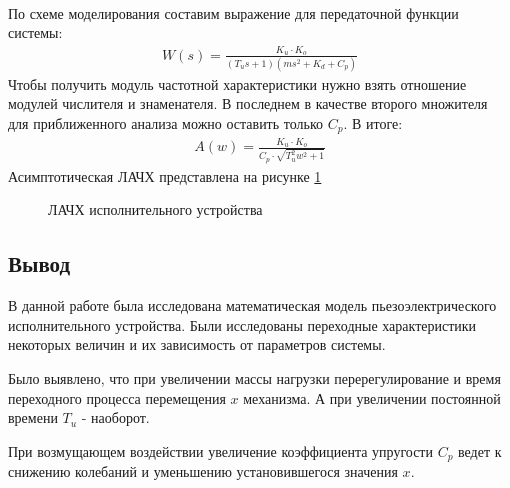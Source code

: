 \documentclass[a4paper,12pt]{article}
\begin{document}
	\paragraph{}По схеме моделирования составим выражение для передаточной функции системы:
	\begin{gather}
	\displaystyle W(s)=\frac{K_u\cdot K_o}{(T_u s+1)(ms^2+K_d+C_p)}
	\end{gather}
	Чтобы получить модуль частотной характеристики нужно взять отношение модулей числителя и знаменателя. В последнем в качестве второго множителя для приближенного анализа можно оставить только $C_p$. В итоге:
	\begin{gather}
	\displaystyle
	A(w)=\frac{K_u\cdot K_o}{C_p\cdot \sqrt{T_u^2 w^2+1}}
	\end{gather}	
	Асимптотическая ЛАЧХ представлена на рисунке \ref{s_7}
	\begin{figure}[h!]
			
		\centering
		
		\caption{ЛАЧХ исполнительного устройства}
			\label{s_7}
	\end{figure}

		\newpage
	\begin{center}
		\section*{Вывод} 
	\end{center}
	\par
	В данной работе была исследована математическая модель пьезоэлектрического исполнительного устройства. Были исследованы переходные характеристики некоторых величин и их зависимость от параметров системы.
	\par
	Было выявлено, что при увеличении массы нагрузки перерегулирование и время переходного процесса перемещения $x$ механизма. А при увеличении постоянной времени $T_u$ - наоборот. 
	\par
	При возмущающем воздействии увеличение коэффициента упругости $C_p$ ведет к снижению колебаний и уменьшению установившегося значения $x$. 
	
\end{document}
